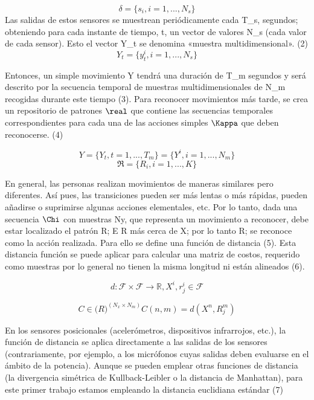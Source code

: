 \documentclass[a4paper]{article}
\begin{document}
\begin{equation}
\delta = \{s_i, i = 1, ..., N_s\}
\end{equation}
Las salidas de estos sensores se muestrean periódicamente cada T_s, segundos; obteniendo
para cada instante de tiempo, t, un vector de valores N_s (cada valor de cada sensor). Esto
el vector Y_t se denomina «muestra multidimensional». (2) 
\begin{equation}
  Y_t = \{y_t^i, i = 1, ..., N_s\}
\end{equation}

Entonces, un simple movimiento Y tendrá una duración de T_m segundos y será
descrito por la secuencia temporal de muestras multidimensionales de N_m recogidas durante este tiempo (3). Para reconocer movimientos más tarde, se crea un repositorio de patrones $\real$ que contiene las secuencias temporales correspondientes para cada una de las acciones simples $\Kappa$ que deben reconocerse. (4) 

\begin{equation}
  Y = \{Y_t, t = 1, ..., T_m\} = \{Y^i, i = 1, ..., N_m\}
\end{equation}
\begin{equation}
  \Re = \{R_i, i = 1, ..., K\}
\end{equation}

En general, las personas realizan movimientos de maneras similares pero diferentes. Así pues, las transiciones pueden ser más lentas o más rápidas, pueden añadirse o suprimirse algunas acciones elementales, etc. Por lo tanto, dada una secuencia $\Chi$ con muestras Ny, que representa un movimiento a reconocer, debe estar localizado el patrón R; E R más cerca de X; por lo tanto R; se reconoce como la acción realizada. Para ello se define una función de distancia (5). Esta distancia función se puede aplicar para calcular una matriz de costos, requerido como muestras por lo general no
tienen la misma longitud ni están alineados (6).

\begin{equation}
  d: \mathcal{F} \times \mathcal{F} \rightarrow \mathbb{R},    X^i , r_j^i \in \mathcal{F}
\end{equation}

\begin{equation}
  C \in \mathbb(R)^(N_x \times N_m)  C(n,m) = d(X^n, R_j^m)
\end{equation}

En los sensores posicionales (acelerómetros, dispositivos infrarrojos, etc.), la función de distancia se aplica directamente a las salidas de los sensores (contrariamente, por ejemplo, a los micrófonos cuyas salidas deben evaluarse en el ámbito de la potencia). Aunque se pueden emplear otras funciones de distancia (la divergencia simétrica de Kullback-Leibler o la distancia de Manhattan), para este primer trabajo estamos empleando la distancia euclidiana estándar (7)
\end{document}
